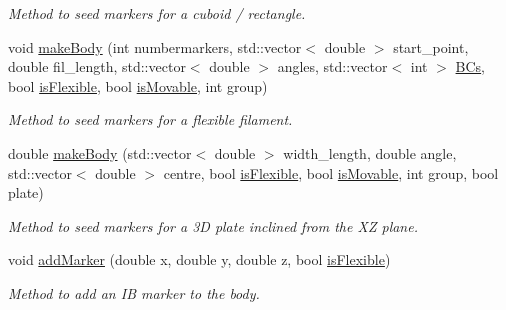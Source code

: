 \begin{DoxyCompactItemize}
\begin{DoxyCompactList}\small\item\em Method to seed markers for a cuboid / rectangle. \end{DoxyCompactList}\item 
void \hyperlink{class_i_b_body_a89bb54240accfc291f4db0b8e3c155bb}{make\+Body} (int numbermarkers, std\+::vector$<$ double $>$ start\+\_\+point, double fil\+\_\+length, std\+::vector$<$ double $>$ angles, std\+::vector$<$ int $>$ \hyperlink{class_i_b_body_ad9fa313d9cb2c2c463740eed5a1faf16}{B\+Cs}, bool \hyperlink{class_i_b_body_a58de7cc12e734b646904e81a56b18b4e}{is\+Flexible}, bool \hyperlink{class_i_b_body_a9f0773d31ac48e0f5b3174e6040732f9}{is\+Movable}, int group)
\begin{DoxyCompactList}\small\item\em Method to seed markers for a flexible filament. \end{DoxyCompactList}\item 
double \hyperlink{class_i_b_body_a77be961607d7ce681f5b6c2fa277d59e}{make\+Body} (std\+::vector$<$ double $>$ width\+\_\+length, double angle, std\+::vector$<$ double $>$ centre, bool \hyperlink{class_i_b_body_a58de7cc12e734b646904e81a56b18b4e}{is\+Flexible}, bool \hyperlink{class_i_b_body_a9f0773d31ac48e0f5b3174e6040732f9}{is\+Movable}, int group, bool plate)
\begin{DoxyCompactList}\small\item\em Method to seed markers for a 3D plate inclined from the XZ plane. \end{DoxyCompactList}\item 
void \hyperlink{class_i_b_body_a0bb2b18d33716b743439c21e6e729eec}{add\+Marker} (double x, double y, double z, bool \hyperlink{class_i_b_body_a58de7cc12e734b646904e81a56b18b4e}{is\+Flexible})
\begin{DoxyCompactList}\small\item\em Method to add an IB marker to the body. \end{DoxyCompactList}\end{DoxyCompactItemize}
